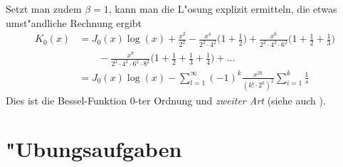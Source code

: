 Setzt man zudem $\beta=1$, kann man die L"osung explizit ermitteln, die
etwas umst"andliche Rechnung ergibt
\begin{align*}
K_0(x)
&=
J_0(x)\log(x)
+
\frac{x^2}{2^2}
-
\frac{x^4}{2^2\cdot 4^2}\biggl(1+\frac12\biggr)
+
\frac{x^6}{2^2\cdot 4^2\cdot 6^2}\biggl(1+\frac12+\frac13\biggr)
\\
&\qquad
-
\frac{x^8}{2^2\cdot 4^2\cdot 6^2\cdot 8^2}\biggl(1+\frac12+\frac13+\frac14\biggr)
+
\dots
\label{potenzreihen:k0}
\\
&=
J_0(x)\log(x)
-\sum_{l=1}^\infty (-1)^k\frac{x^{2k}}{(k!\cdot 2^k)^2}\sum_{i=1}^k\frac1s
\end{align*}
Dies ist die Bessel-Funktion 0-ter Ordnung und {\em zweiter Art} (siehe auch
\cite{skript:smirnow2}).

\section{"Ubungsaufgaben}




